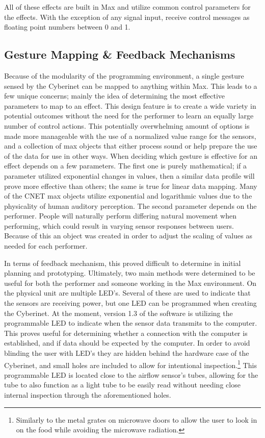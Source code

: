 All of these effects are built in Max and utilize common control parameters for the effects. With the exception of any signal input, receive control messages as floating point numbers between 0 and 1.

\subsection{Gesture Mapping \& Feedback Mechanisms}

Because of the modularity of the programming environment, a single gesture sensed by the Cyberinet can be mapped to anything within Max. This leads to a few unique concerns; mainly the idea of determining the most effective parameters to map to an effect. This design feature is to create a wide variety in potential outcomes without the need for the performer to learn an equally large number of control actions. This potentially overwhelming amount of options is made more manageable with the use of a normalized value range for the sensors, and a collection of max objects that either process sound or help prepare the use of the data for use in other ways. When deciding which gesture is effective for an effect depends on a few parameters. The first one is purely mathematical; if a parameter utilized exponential changes in values, then a similar data profile will prove more effective than others; the same is true for linear data mapping. Many of the CNET max objects utilize exponential and logarithmic values due to the physicality of human auditory perception. The second parameter depends on the performer. People will naturally perform differing natural movement when performing\cite{wanderleyClarinetGesture2005}, which could result in varying sensor responses between users. Because of this an object was created in order to adjust the scaling of values as needed for each performer.

In terms of feedback mechanism, this proved difficult to determine in initial planning and prototyping. Ultimately, two main methods were determined to be useful for both the performer and someone working in the Max environment. On the physical unit are multiple LED's. Several of these are used to indicate that the sensors are receiving power, but one LED can be programmed when creating the Cyberinet. At the moment, version 1.3 of the software is utilizing the programmable LED to indicate when the sensor data transmits to the computer. This proves useful for determining whether a connection with the computer is established, and if data should be expected by the computer. In order to avoid blinding the user with LED's they are hidden behind the hardware case of the Cyberinet, and small holes are included to allow for intentional inspection.\footnote{Similarly to the metal grates on microwave doors to allow the user to look in on the food while avoiding the microwave radiation.} This programmable LED is located close to the airflow sensor's tubes, allowing for the tube to also function as a light tube to be easily read without needing close internal inspection through the aforementioned holes.

